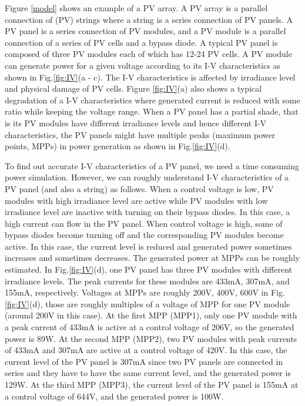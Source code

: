 \documentclass[conference]{IEEEtran}
\begin{document}
Figure \ref{model} shows an example of a PV array. A PV array is a parallel connection of (PV) strings where a string is a series connection of PV panels. A PV panel is a series connection of PV modules, and a PV module is a parallel connection of a series of PV cells and a bypass diode. A typical PV panel is composed of three PV modules each of which has 12-24 PV cells. A PV module can generate power for a given voltage according to its I-V characteristics as shown in Fig.\ref{fig:IV}(a - c). The I-V characteristics is affected by irradiance level and physical damage of PV cells. Figure \ref{fig:IV}(a) also shows a typical degradation of a I-V characteristics where generated current is reduced with some ratio while keeping the voltage range. When a PV panel has a partial shade, that is its PV modules have different irradiance levels and hence different I-V characteristics, the PV panels might have multiple peaks (maximum power points, MPPs) in power generation as shown in Fig.\ref{fig:IV}(d). 

To find out accurate I-V characteristics of a PV panel, we need a time consuming power simulation. However, we can roughly understand I-V characteristics of a PV panel (and also a string) as follows. When a control voltage is low, PV modules with high irradiance level are active while PV modules with low irradiance level are inactive with turning on their bypass diodes. In this case, a high current can flow in the PV panel. When control voltage is high, some of bypass diodes become turning off and the corresponding PV modules become active. In this case, the current level is reduced and generated power sometimes increases and sometimes decreases. The generated power at MPPs can be roughly estimated. In Fig.\ref{fig:IV}(d), one PV panel has three PV modules with different irradiance levels. The peak currents for these modules are 433mA, 307mA, and 155mA, respectively. Voltages at MPPs are roughly 200V, 400V, 600V in Fig.\ref{fig:IV}(d), those are roughly multiples of a voltage of MPP for one PV module (around 200V in this case). At the first MPP (MPP1), only one PV module with a peak current of 433mA is active at a control voltage of 206V, so the generated power is 89W. At the second MPP (MPP2), two PV modules with peak currents of 433mA and 307mA are active at a control voltage of 420V. In this case, the current level of the PV panel is 307mA since two PV panels are connected in series and they have to have the same current level, and the generated power is 129W. At the third MPP (MPP3), the current level of the PV panel is 155mA at a control voltage of 644V, and the generated power is 100W. 
\end{document}
